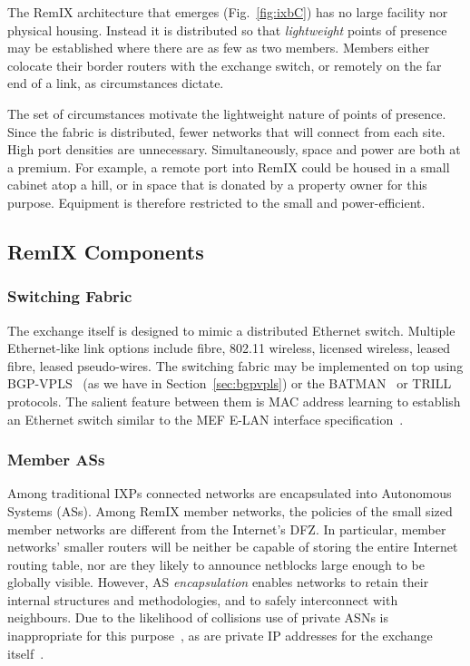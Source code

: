 The RemIX architecture that emerges (Fig.~\ref{fig:ixbC})
has no large facility nor physical housing. Instead it is
distributed so that \emph{lightweight} points of presence may be established
where there are as few as two members. Members either colocate their border
routers with the exchange switch, or remotely on the far end of a link, as
circumstances dictate.

The set of circumstances motivate the lightweight nature of points of presence.
Since the fabric is distributed, fewer networks that will connect from each
site. High port densities are unnecessary. Simultaneously, space and power are
both at a premium. For example, a remote port into RemIX could be housed in a
small cabinet atop a hill, or in space that is donated by a property owner for
this purpose. Equipment is therefore restricted to the small and
power-efficient.


\subsection{RemIX Components}

\subsubsection{Switching Fabric}

The exchange itself is designed to mimic a distributed Ethernet switch. Multiple
Ethernet-like link options include fibre, 802.11 wireless, licensed wireless,
leased fibre, leased pseudo-wires. The switching fabric may be implemented on
top using BGP-VPLS~\cite{rfc4761} (as we have in
Section~\ref{sec:bgpvpls}) or the
\acs{BATMAN}~\cite{johnson2008simple} or
\acs{TRILL}~\cite{perlman2004rbridges} protocols. The salient feature
between them is MAC address learning to establish an Ethernet switch
similar to the \ac{MEF} E-LAN interface
specification~\cite{mef62,mefes}.

\subsubsection{Member \acp{AS}}

Among traditional \acp{IXP} connected networks are encapsulated into Autonomous
Systems (\acp{AS}). Among RemIX member networks, the policies of the small sized
member networks are
different from the Internet's \ac{DFZ}. In particular, member networks' smaller
routers will be neither be capable of storing the entire Internet routing table,
nor are they likely to announce netblocks large enough to be globally visible.
However, \ac{AS} \emph{encapsulation} enables networks to retain their internal
structures and methodologies, and to safely interconnect with neighbours. Due to
the likelihood of collisions use of private \acp{ASN} is inappropriate for this
purpose~\cite{rfc6996}, as are private IP addresses for the exchange
itself~\cite{rfc1918}.

